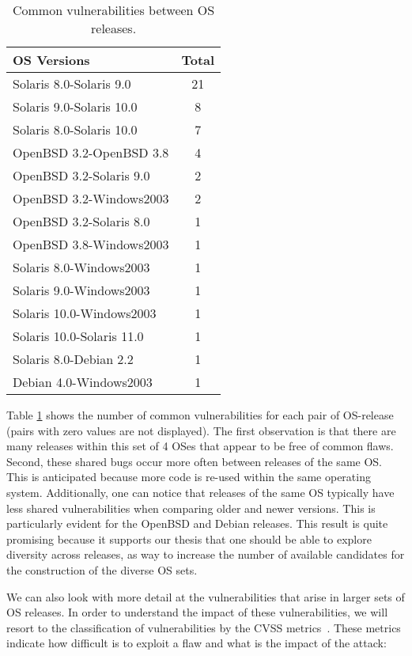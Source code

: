 \begin{table}[!ht]
\caption{Common vulnerabilities between OS releases.}
\label{tab:vulns_releases}
\begin{center}
{\scriptsize
\begin{tabular}{|l|c|}\hline
\textbf{OS Versions} & Total  \\\hline\hline
Solaris 8.0-Solaris 9.0 	&21\\
Solaris 9.0-Solaris 10.0 	&8\\
Solaris 8.0-Solaris 10.0 	&7\\
OpenBSD 3.2-OpenBSD 3.8 & 4 \\
OpenBSD 3.2-Solaris 9.0 & 2 \\
OpenBSD 3.2-Windows2003 & 2 \\
OpenBSD 3.2-Solaris 8.0 & 1 \\
OpenBSD 3.8-Windows2003 & 1 \\
Solaris 8.0-Windows2003 & 1 \\
Solaris 9.0-Windows2003 & 1 \\
Solaris 10.0-Windows2003 & 1 \\
Solaris 10.0-Solaris 11.0	& 1 \\
Solaris 8.0-Debian 2.2 &	1 \\
Debian 4.0-Windows2003 & 1 \\\hline
\end{tabular}
}
\end{center}
\end{table}

Table \ref{tab:vulns_releases} shows the number of common vulnerabilities for each pair of OS-release (pairs with zero values are not displayed). The first observation is that there are many releases within this set of 4 OSes that appear to be free of common flaws. Second, these shared bugs occur more often between releases of the same OS. This is anticipated because more code is re-used within the same operating system. Additionally, one can notice that releases of the same OS typically have less shared vulnerabilities when comparing older and newer versions. This is particularly evident for the OpenBSD and Debian releases. This result is quite promising because it supports our thesis that one should be able to explore diversity across releases, as way to increase the number of available candidates for the construction of the diverse OS sets.


We can also look with more detail at the vulnerabilities that arise in larger sets of OS releases. In order to understand the impact of these vulnerabilities, we will resort to the classification of vulnerabilities by the CVSS metrics~\cite{cvss}. These metrics indicate how difficult is to exploit a flaw and what is the impact of the attack:

